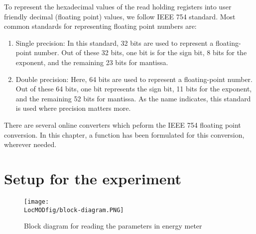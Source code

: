 

To represent the hexadecimal values of the read holding
registers into user friendly decimal (floating point) values, we
follow IEEE 754 standard. Most common standards for representing
floating point numbers are:
\begin{enumerate}
  \item Single precision: In this standard, 32 bits are used to represent a floating-point number. Out of these 32 bits, one bit is for the sign bit, 8 bits for the exponent, and the remaining 23 bits for mantissa.
  \item Double precision: Here, 64 bits are used to represent a floating-point number. Out of these 64 bits, one bit represents the sign bit, 11 bits for the exponent, and the remaining 52 bits for mantissa. As the name indicates, this standard is used where precision matters more.
\end{enumerate}
There are several online converters \cite{ieee-754-conv} which peform the
IEEE 754 floating point conversion. In this chapter, a function has been formulated for this conversion, wherever needed.    


\section{Setup for the experiment}
\begin{figure}
  \centering
  \texttt{[image: \\LocMODfig/block-diagram.PNG]}
  \caption{Block diagram for reading the parameters in energy meter}
  \label{fig:block-diagram}
\end{figure}


